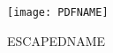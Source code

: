 \begin{figure}[h!]
    \begin{center}
      \texttt{[image: PDFNAME]}
    \end{center}
    \caption{ESCAPEDNAME}
    \label{fig:PLOTNAME}
\end{figure}
